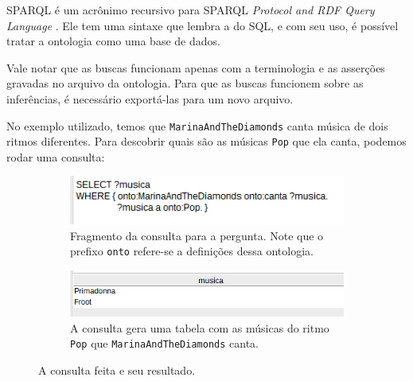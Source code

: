 SPARQL é um acrônimo recursivo para SPARQL \textit{Protocol and RDF Query Language} \cite{ferramentasSPARQL}. Ele tem uma sintaxe que lembra a do SQL, e com seu uso, é possível tratar a ontologia como uma base de dados.  

Vale notar que as buscas funcionam apenas com a terminologia e as asserções gravadas no arquivo da ontologia. Para que as buscas funcionem sobre as inferências, é necessário exportá-las para um novo arquivo.

No exemplo utilizado, temos que \texttt{MarinaAndTheDiamonds} canta música de dois ritmos diferentes. Para descobrir quais são as músicas \texttt{Pop} que ela canta, podemos rodar uma consulta:

\begin{figure}[H]
	\centering
	\begin{subfigure}{.7\textwidth}
		\centering
		\includegraphics[width=0.95\linewidth]{Capitulos/Ferramentas/query}
		\caption{Fragmento da consulta para a pergunta. Note que o prefixo \texttt{onto} refere-se a definições dessa ontologia.}
	\end{subfigure}
	\begin{subfigure}{.7\textwidth}
		\centering
		\includegraphics[width=0.95\linewidth]{Capitulos/Ferramentas/resultado}
		\caption{A consulta gera uma tabela com as músicas do ritmo \texttt{Pop} que \texttt{MarinaAndTheDiamonds} canta.}
	\end{subfigure}
	\caption{A consulta feita e seu resultado.}
\end{figure}